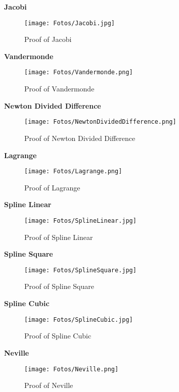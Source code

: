 \documentclass[letterpaper,12pt]{article}
\begin{document}
\textbf{Jacobi}

\begin{figure}[H]
  \texttt{[image: Fotos/Jacobi.jpg]}
  \caption{Proof of Jacobi}
  \label{fig:cond}
\end{figure}
\textbf{\textbf{\textbf{}}}


\textbf{Vandermonde}

\begin{figure}[H]
  \texttt{[image: Fotos/Vandermonde.png]}
  \caption{Proof of Vandermonde}
  \label{fig:cond}
\end{figure}
\textbf{\textbf{\textbf{}}}

\textbf{Newton Divided Difference}

\begin{figure}[H]
  \texttt{[image: Fotos/NewtonDividedDifference.png]}
  \caption{Proof of Newton Divided Difference}
  \label{fig:cond}
\end{figure}
\textbf{\textbf{\textbf{}}}

\textbf{Lagrange}

\begin{figure}[H]
  \texttt{[image: Fotos/Lagrange.png]}
  \caption{Proof of Lagrange}
  \label{fig:cond}
\end{figure}
\textbf{\textbf{\textbf{}}}

\textbf{Spline Linear}

\begin{figure}[H]
  \texttt{[image: Fotos/SplineLinear.jpg]}
  \caption{Proof of Spline Linear}
  \label{fig:cond}
\end{figure}
\textbf{\textbf{\textbf{}}}

\textbf{Spline Square}

\begin{figure}[H]
  \texttt{[image: Fotos/SplineSquare.jpg]}
  \caption{Proof of Spline Square}
  \label{fig:cond}
\end{figure}
\textbf{\textbf{\textbf{}}}

\textbf{Spline Cubic}

\begin{figure}[H]
  \texttt{[image: Fotos/SplineCubic.jpg]}
  \caption{Proof of Spline Cubic}
  \label{fig:cond}
\end{figure}
\textbf{\textbf{\textbf{}}}


\textbf{Neville}

\begin{figure}[H]
  \texttt{[image: Fotos/Neville.png]}
  \caption{Proof of Neville}
  \label{fig:cond}
\end{figure}
\textbf{\textbf{\textbf{}}}
\end{document}
